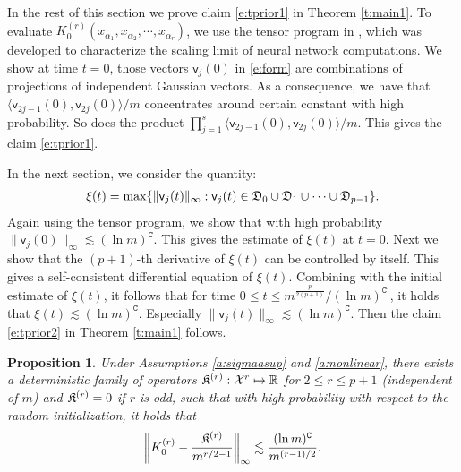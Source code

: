 \documentclass{article}
\numberwithin{equation}{section}
\newcommand\cX{{\mathcal X}}
\newcommand{\fC}{{\mathtt C}}
\newcommand{\fD}{{\frak D}}
\newcommand{\fK}{{\frak K}}
\newcommand{\sfv}{{\mathsf v}}
\newcommand{\sfu}{{\mathsf u}}
\newcommand{\bR}{{\mathbb R}}
\newcommand{\al}{\alpha}
\renewcommand{\leq}{\leqslant}
\newcommand{\cor}{\color{darkred}}
\newcommand{\1}{\mathds{1}}
\theoremstyle{plain} %
\newtheorem{proposition}[theorem]{Proposition}
\begin{document}


In the rest of this section we prove claim \eqref{e:tprior1} in Theorem \ref{t:main1}.
To evaluate $K_0^{(r)}(x_{\al_1}, x_{\al_2}, \cdots, x_{\al_r})$, we use the {tensor program} in \cite{DBLP:journals/corr/abs-1902-04760}, which was developed to characterize the scaling limit of neural network computations. We show at time $t=0$, those vectors $\sfv_j(0)$ in \eqref{e:form} are combinations of projections of independent Gaussian vectors. As a consequence, we have that $\langle \sfv_{2j-1}(0), \sfv_{2j}(0)\rangle/m$ concentrates around certain constant with high probability. So does the product $\prod_{j=1}^s \langle \sfv_{2j-1}(0), \sfv_{2j}(0)\rangle/m$. This gives the claim \eqref{e:tprior1}. 

In the next section, we consider the quantity:
\begin{align*}
 \xi(t)=\max\{\|\sfv_j(t)\|_\infty: \sfv_j(t)\in \fD_0\cup\fD_1\cup\cdots\cup \fD_{p-1}\}.
 \end{align*}
Again using the tensor program, we show that with high probability $\|\sfv_j(0)\|_\infty\lesssim (\ln m)^\fC$. This gives the estimate of $\xi(t)$ at $t=0$. Next we show that the $(p+1)$-th derivative of $\xi(t)$ can be controlled by itself. This gives a self-consistent differential equation of $\xi(t)$. Combining with the initial estimate of $\xi(t)$, it follows that for time ${0\leq  t\leq m^{\frac{p}{2(p+1)}}}/(\ln m)^{\fC'}$, it holds that $\xi(t)\lesssim (\ln m)^{\fC}$. Especially $\|\sfv_j(t)\|_\infty\lesssim (\ln m)^\fC$. Then the claim \eqref{e:tprior2} in Theorem \ref{t:main1} follows.






\begin{proposition}\label{p:Krlimit}
Under Assumptions \ref{a:sigmaasup} and \ref{a:nonlinear}, there exists a deterministic family of operators $\fK^{(r)}: \cX^r\mapsto \bR$ for $2\leq r\leq p+1$ (independent of $m$) and $\fK^{(r)}=0$ if $r$ is odd, such that with high probability with respect to the random initialization, it holds that
\begin{align}\label{e:Krlimit}
\left\|K^{(r)}_0-\frac{\fK^{(r)}}{m^{r/2-1}}\right\|_{\infty}\lesssim \frac{(\ln m)^\fC}{m^{(r-1)/2}}.
\end{align}
\end{proposition}
\end{document}
